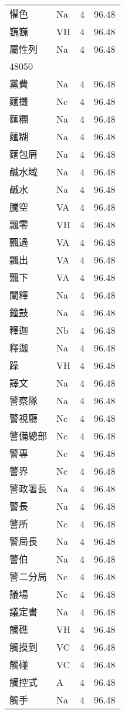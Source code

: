 \documentclass[twocolumn]{book}
\begin{document}
\begin{supertabular}{llrr}
懼色 & Na & 4 &  96.48\\
巍巍 & VH & 4 &  96.48\\
屬性列 & Na & 4 &  96.48\\
48050\\
黨費 & Na & 4 &  96.48\\
麵攤 & Nc & 4 &  96.48\\
麵糰 & Na & 4 &  96.48\\
麵糊 & Na & 4 &  96.48\\
麵包屑 & Na & 4 &  96.48\\
鹹水域 & Na & 4 &  96.48\\
鹹水 & Na & 4 &  96.48\\
騰空 & VA & 4 &  96.48\\
飄零 & VH & 4 &  96.48\\
飄過 & VA & 4 &  96.48\\
飄出 & VA & 4 &  96.48\\
飄下 & VA & 4 &  96.48\\
闡釋 & Na & 4 &  96.48\\
鐘鼓 & Na & 4 &  96.48\\
釋迦 & Nb & 4 &  96.48\\
釋迦 & Na & 4 &  96.48\\
躁 & VH & 4 &  96.48\\
譯文 & Na & 4 &  96.48\\
警察隊 & Na & 4 &  96.48\\
警視廳 & Nc & 4 &  96.48\\
警備總部 & Nc & 4 &  96.48\\
警專 & Nc & 4 &  96.48\\
警界 & Nc & 4 &  96.48\\
警政署長 & Na & 4 &  96.48\\
警長 & Na & 4 &  96.48\\
警所 & Nc & 4 &  96.48\\
警局長 & Na & 4 &  96.48\\
警伯 & Na & 4 &  96.48\\
警二分局 & Nc & 4 &  96.48\\
議場 & Nc & 4 &  96.48\\
議定書 & Na & 4 &  96.48\\
觸礁 & VH & 4 &  96.48\\
觸摸到 & VC & 4 &  96.48\\
觸碰 & VC & 4 &  96.48\\
觸控式 & A & 4 &  96.48\\
觸手 & Na & 4 &  96.48\\

\end{supertabular}
\end{document}
